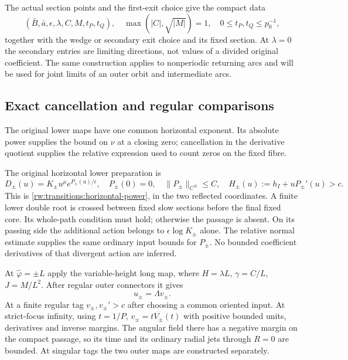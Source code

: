 The actual section points and the first-exit choice give the compact data
\[
 (\bar B,\bar a,\epsilon,\lambda,C,M,t_P,t_Q),
 \quad \max(|C|,\sqrt{|M|})=1,\quad
 0\le t_P,t_Q\le p_0^{-1},
\]
together with the wedge or secondary exit choice and its fixed
section. At $\lambda=0$ the secondary entries are limiting
directions, not values of a divided original coefficient.
The same construction applies to nonperiodic returning arcs and
will be used for joint limits of an outer orbit and intermediate arcs.

\subsection{Exact cancellation and regular comparisons}

The original lower maps have one common horizontal exponent. Its
absolute power supplies the bound on $\nu$ at a closing zero;
cancellation in the derivative quotient supplies the relative expression
used to count zeros on the fixed fibre.

The original horizontal lower preparation is
\begin{equation}\label{rw:secondary:lower}
 D_\pm(u)=K_\pm u^\mu e^{P_\pm(u)/\epsilon},\quad
 P_\pm(0)=0,\quad \|P_\pm\|_{C^N}\le C,\quad
 H_\pm(u):=h_I+uP_\pm'(u)>c .
\end{equation}
This is \eqref{rw:transitions:horizontal-power}, in the two reflected
coordinates. A finite lower double root is crossed between fixed
slow sections before the final fixed core. Its whole-path condition
must hold; otherwise the passage is absent. On its passing side the
additional action belongs to $\epsilon\log K_\pm$ alone.
The relative normal estimate supplies the same ordinary input bounds
for $P_\pm$. No bounded coefficient derivatives of that divergent
action are inferred.

At $\hat\varphi=\pm L$ apply the variable-height long map, where
$H=\lambda L$, $\gamma=C/L$, $J=M/L^2$.
After regular outer connectors it gives
\begin{equation}\label{rw:secondary:normalized-inputs}
 u_\pm=\Lambda v_\pm .
\end{equation}
At a finite regular tag $v_\pm,v_\pm'>c$ after choosing a common
oriented input. At strict-focus infinity, using $t=1/P$,
$v_\pm=tV_\pm(t)$ with positive bounded units, derivatives and
inverse margins. The angular field there has a negative margin
on the compact passage, so its time and its ordinary radial jets
through $R=0$ are bounded. At singular tags the two outer maps
are constructed separately.

